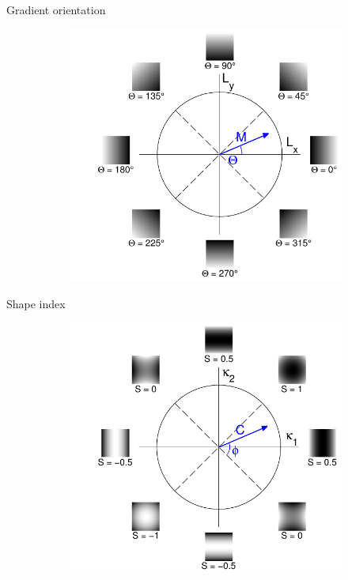 \documentclass[14pt,t]{beamer}
\begin{document}
\begin{frame}{Gradient orientation}
\begin{figure}
\centering
	\begin{subfigure}[t]{0.75\textwidth}
		\includegraphics[width=\textwidth]{../report/img/gradientOrientationTheory.pdf}
	\end{subfigure}
\end{figure}
\end{frame}
%
\begin{frame}{Shape index}
\begin{figure}
\centering
	\begin{subfigure}[t]{0.75\textwidth}
		\includegraphics[width=\textwidth]{../report/img/shapeIndexTheory.pdf}
	\end{subfigure}
\end{figure}
\end{frame}
\end{document}

